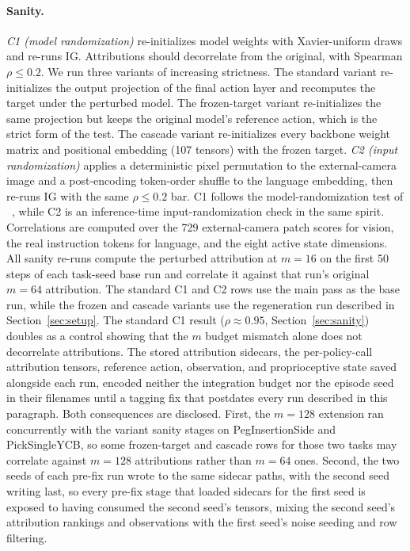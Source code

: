 \documentclass{article}
\begin{document}
\paragraph{Sanity.}
\emph{C1 (model randomization)} re-initializes model weights with Xavier-uniform draws and re-runs IG.
Attributions should decorrelate from the original, with Spearman $\rho \leq 0.2$.
We run three variants of increasing strictness.
The standard variant re-initializes the output projection of the final action layer and recomputes the target under the perturbed model.
The frozen-target variant re-initializes the same projection but keeps the original model's reference action, which is the strict form of the test.
The cascade variant re-initializes every backbone weight matrix and positional embedding (107 tensors) with the frozen target.
\emph{C2 (input randomization)} applies a deterministic pixel permutation to the external-camera image and a post-encoding token-order shuffle to the language embedding, then re-runs IG with the same $\rho \leq 0.2$ bar.
C1 follows the model-randomization test of \citeauthor{adebayo2018sanity}~, while C2 is an inference-time input-randomization check in the same spirit.
Correlations are computed over the 729 external-camera patch scores for vision, the real instruction tokens for language, and the eight active state dimensions.
All sanity re-runs compute the perturbed attribution at $m{=}16$ on the first 50 steps of each task-seed base run and correlate it against that run's original $m{=}64$ attribution.
The standard C1 and C2 rows use the main pass as the base run, while the frozen and cascade variants use the regeneration run described in Section~\ref{sec:setup}.
The standard C1 result ($\rho \approx 0.95$, Section~\ref{sec:sanity}) doubles as a control showing that the $m$ budget mismatch alone does not decorrelate attributions.
The stored attribution sidecars, the per-policy-call attribution tensors, reference action, observation, and proprioceptive state saved alongside each run, encoded neither the integration budget nor the episode seed in their filenames until a tagging fix that postdates every run described in this paragraph.
Both consequences are disclosed.
First, the $m{=}128$ extension ran concurrently with the variant sanity stages on PegInsertionSide and PickSingleYCB, so some frozen-target and cascade rows for those two tasks may correlate against $m{=}128$ attributions rather than $m{=}64$ ones.
Second, the two seeds of each pre-fix run wrote to the same sidecar paths, with the second seed writing last, so every pre-fix stage that loaded sidecars for the first seed is exposed to having consumed the second seed's tensors, mixing the second seed's attribution rankings and observations with the first seed's noise seeding and row filtering.
\end{document}
